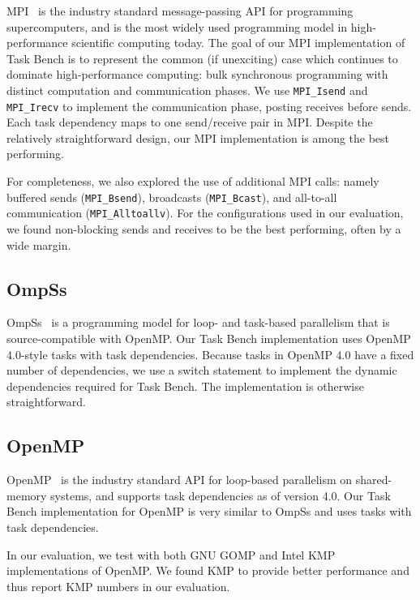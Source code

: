 MPI~\cite{MPI} is the industry standard message-passing API for
programming supercomputers, and is the most widely used programming
model in high-performance scientific computing today. The goal of our
MPI implementation of Task Bench is to represent the common (if
unexciting) case which continues to dominate high-performance
computing: bulk synchronous programming with distinct computation and
communication phases. We use \lstinline[language=C++]{MPI_Isend} and
\lstinline[language=C++]{MPI_Irecv} to implement the communication
phase, posting receives before sends. Each task dependency maps to one
send/receive pair in MPI. Despite the relatively straightforward
design, our MPI implementation is among the best performing.

For completeness, we also explored the use of additional MPI calls:
namely buffered sends (\lstinline[language=C++]{MPI_Bsend}),
broadcasts (\lstinline[language=C++]{MPI_Bcast}), and all-to-all
communication (\lstinline[language=C++]{MPI_Alltoallv}). For the
configurations used in our evaluation, we found non-blocking sends and
receives to be the best performing, often by a wide margin.

\subsection{OmpSs}

OmpSs~\cite{OmpSs11} is a programming model for loop- and task-based parallelism
that is source-compatible with OpenMP. Our Task Bench implementation
uses OpenMP 4.0-style tasks with task dependencies. Because tasks in
OpenMP 4.0 have a fixed number of dependencies, we use a switch
statement to implement the dynamic dependencies required for Task
Bench. The implementation is otherwise straightforward.


\subsection{OpenMP}

OpenMP~\cite{OpenMPSpec40} is the industry standard API for loop-based
parallelism on shared-memory systems, and supports task dependencies as of version 4.0. Our Task Bench implementation
for OpenMP is very similar to OmpSs and uses tasks with
task dependencies.

In our evaluation, we test with both GNU GOMP and Intel KMP
implementations of OpenMP. We found KMP to provide better performance
and thus report KMP numbers in our evaluation.


